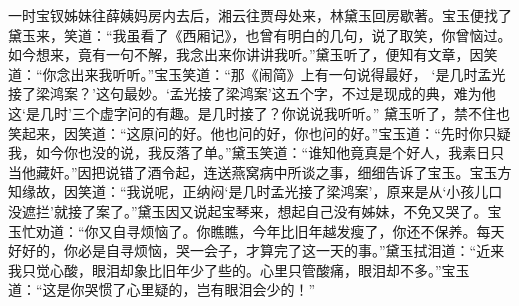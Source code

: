 \begin{parag}
    一时宝钗姊妹往薛姨妈房内去后，湘云往贾母处来，林黛玉回房歇著。宝玉便找了黛玉来，笑道：“我虽看了《西厢记》，也曾有明白的几句，说了取笑，你曾恼过。如今想来，竟有一句不解，我念出来你讲讲我听。”黛玉听了，便知有文章，因笑道：“你念出来我听听。”宝玉笑道：“那《闹简》上有一句说得最好， ‘是几时孟光接了梁鸿案？’这句最妙。‘孟光接了梁鸿案’这五个字，不过是现成的典，难为他这‘是几时’三个虚字问的有趣。是几时接了？你说说我听听。” 黛玉听了，禁不住也笑起来，因笑道：“这原问的好。他也问的好，你也问的好。”宝玉道：“先时你只疑我，如今你也没的说，我反落了单。”黛玉笑道：“谁知他竟真是个好人，我素日只当他藏奸。”因把说错了酒令起，连送燕窝病中所谈之事，细细告诉了宝玉。宝玉方知缘故，因笑道：“我说呢，正纳闷‘是几时孟光接了梁鸿案’，原来是从‘小孩儿口没遮拦’就接了案了。”黛玉因又说起宝琴来，想起自己没有姊妹，不免又哭了。宝玉忙劝道：“你又自寻烦恼了。你瞧瞧，今年比旧年越发瘦了，你还不保养。每天好好的，你必是自寻烦恼，哭一会子，才算完了这一天的事。”黛玉拭泪道：“近来我只觉心酸，眼泪却象比旧年少了些的。心里只管酸痛，眼泪却不多。”宝玉道：“这是你哭惯了心里疑的，岂有眼泪会少的！”
\end{parag}


